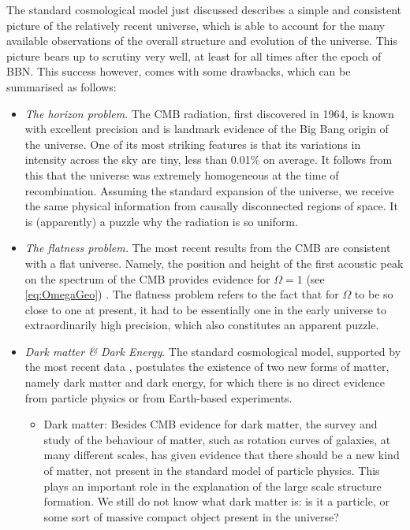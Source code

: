 The standard cosmological model just discussed describes a simple and consistent picture of the relatively recent universe,  which is able to account for the many available observations of the overall structure and evolution of the universe. This picture bears up to scrutiny very well, at least for all times after the epoch of BBN. This success however, comes with some drawbacks, which  can be summarised as follows:

\begin{itemize}

\item  {\em The horizon problem}.  The CMB radiation, first discovered in 1964, is known with excellent precision and  is landmark evidence of the Big Bang origin of the universe. 
One of its most striking features is that its variations in intensity across the sky are tiny, less than 0.01\% on average.
It follows from this that the universe was extremely homogeneous at the time of recombination. Assuming the standard expansion of the universe,
we receive the same physical information from causally disconnected regions of space. It is (apparently) a puzzle why the radiation is so uniform.

\item {\em The flatness problem.}  The most recent results from the CMB are consistent with a flat universe. Namely, the  position and height of the first acoustic peak on the spectrum of the CMB provides evidence for $\Omega=1$ (see \eqref{eq:OmegaGeo}) \cite{Planck:2018vyg}.
 The flatness problem refers to the fact that for $\Omega$ to be so close to one at present, it had to be essentially one in the early universe to extraordinarily high precision, which also constitutes an apparent puzzle.

\item {\em Dark matter \& Dark Energy}. The standard cosmological model, supported by the most recent data \cite{Planck:2018vyg},  postulates the existence of two new forms of matter, namely dark matter and dark energy,  for which there is  no direct evidence from particle physics or from Earth-based experiments.

\begin{itemize}

\item Dark matter: Besides CMB evidence for dark matter, the survey and study of the behaviour of matter, such as rotation curves of galaxies, at many different scales, has given evidence that there should be a new kind of matter, not present in the standard model of particle physics. This plays  an important role in the explanation of the large scale structure formation. We still do not know what dark matter is: is it a particle, or some sort of  massive compact object present in the universe?


\end{itemize}
\end{itemize}
